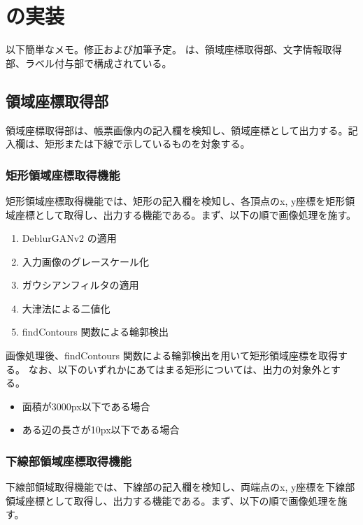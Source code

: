 \chapter{\toolName の実装}\label{cha:Implementation}
以下簡単なメモ。修正および加筆予定。
\toolName は、領域座標取得部、文字情報取得部、ラベル付与部で構成されている。


\section{領域座標取得部}\label{sec:area_coords_obtainment_part}
領域座標取得部は、帳票画像内の記入欄を検知し、領域座標として出力する。記入欄は、矩形または下線で示しているものを対象する。


\subsection{矩形領域座標取得機能}\label{subsec:rect_coords_obtainment}
矩形領域座標取得機能では、矩形の記入欄を検知し、各頂点のx, y座標を矩形領域座標として取得し、出力する機能である。まず、以下の順で画像処理を施す。

\begin{enumerate}[label=(\arabic*)]
    \item DeblurGANv2 の適用
    \item 入力画像のグレースケール化
    \item ガウシアンフィルタの適用
    \item 大津法による二値化
    \item findContours 関数による輪郭検出
\end{enumerate}

画像処理後、findContours 関数による輪郭検出を用いて矩形領域座標を取得する。
なお、以下のいずれかにあてはまる矩形については、出力の対象外とする。

\begin{itemize}
    \item 面積が3000px以下である場合
    \item ある辺の長さが10px以下である場合
\end{itemize}


\subsection{下線部領域座標取得機能}\label{subsec:underline_coords_obtainment}
下線部領域取得機能では、下線部の記入欄を検知し、両端点のx, y座標を下線部領域座標として取得し、出力する機能である。まず、以下の順で画像処理を施す。

